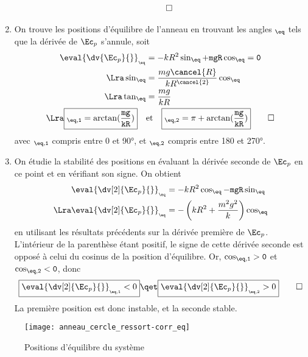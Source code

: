 \documentclass[a4paper, 12pt, final, garamond]{book}
\begin{document}
\begin{enumerate}
\begin{align*}
            \qed
        \end{align*}
    \item On trouve les positions d'équilibre de l'anneau en trouvant les angles
        $\tt_{\eq}$ tels que la dérivée de $\Ec_p$ s'annule, soit
        \begin{align*}
            \eval{\dv{\Ec_p}{\tt}}_{\tt_{\eq}} &= -kR^2\sin\tt_{\eq} +
            mgR\cos\tt_{\eq} = 0
            \\\Lra
            \sin\tt_{\eq} &= \frac{mg\cancel{R}}{kR^{\cancel{2}}}\cos\tt_{\eq}
            \\\Lra
            \tan\tt_{\eq} &= \frac{mg}{kR}
            \\\Lra
            \boxed{\tt_{\eq,1} = \arctan(\frac{mg}{kR})}
            \quad&\text{et}\quad
            \boxed{\tt_{\eq,2} = \pi + \arctan(\frac{mg}{kR})}
            \qed
        \end{align*}
        avec $\tt_{\eq,1}$ compris entre 0 et \ang{90}, et $\tt_{\eq,2}$ compris
        entre 180 et \ang{270}.
    \item On étudie la stabilité des positions en évaluant la dérivée seconde de
        $\Ec_p$ en ce point et en vérifiant son signe. On obtient
        \begin{align*}
            \eval{\dv[2]{\Ec_p}{\tt}}_{\tt_{\eq}} &= -kR^2\cos\tt_{\eq}
            -mgR\sin\tt_{\eq}
            \\\Lra
            \eval{\dv[2]{\Ec_p}{\tt}}_{\tt_{\eq}} &= -\left(kR^2 +
                \frac{m^2g^2}{k}\right)\cos\tt_{\eq}
        \end{align*}
        en utilisant les résultats précédents sur la dérivée première de
        $\Ec_p$. L'intérieur de la parenthèse étant positif, le signe de cette
        dérivée seconde est opposé à celui du cosinus de la position
        d'équilibre. Or,
        $\cos\tt_{\eq,1} > 0$ et $\cos\tt_{\eq,2} < 0$, donc
        \begin{gather*}
            \boxed{\eval{\dv[2]{\Ec_p}{\tt}}_{\tt_{\eq,1}} < 0}
            \qet
            \boxed{\eval{\dv[2]{\Ec_p}{\tt}}_{\tt_{\eq,2}} > 0}
            \qed
        \end{gather*}
        La première position est donc instable, et la seconde stable.
\end{enumerate}
\begin{figure}[htbp]
    \centering
    \texttt{[image: anneau\_cercle\_ressort-corr\_eq]}
    \captionsetup{justification=centering}
    \caption{Positions d'équilibre du système}
    \label{fig:anncerccorr}
\end{figure}
\end{document}
